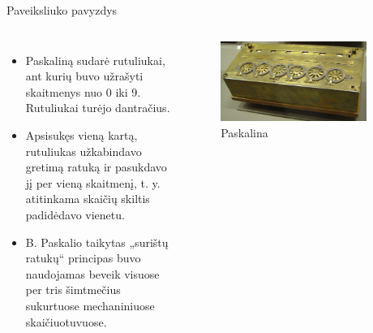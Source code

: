 \documentclass[12pt]{beamer}
\begin{document}
\begin{frame}{Paveiksliuko pavyzdys}
    \begin{center}
        \begin{columns}[onlytextwidth]
            \begin{itemize}
                \item Paskaliną sudarė rutuliukai, ant kurių buvo užrašyti skaitmenys nuo 0 iki 9. Rutuliukai turėjo dantračius.
                \item Apsisukęs vieną kartą, rutuliukas užkabindavo gretimą ratuką ir pasukdavo jį per vieną skaitmenį, t. y. atitinkama skaičių skiltis padidėdavo vienetu.
                \item B. Paskalio taikytas „surištų ratukų“ principas buvo naudojamas beveik visuose per tris šimtmečius sukurtuose mechaniniuose skaičiuotuvuose.
            \end{itemize}
            \begin{figure}
                \centering
                \includegraphics[width=0.9\textwidth]{resources/Pascaline.jpg}
                \caption[]{Paskalina\cite{paskalina}}
            \end{figure}
        \end{columns}
    \end{center}
\end{frame}
\end{document}
